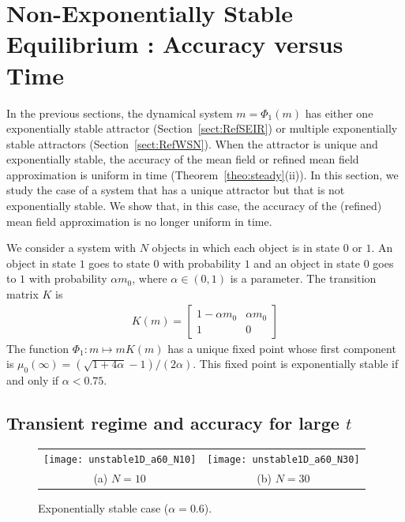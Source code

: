 \documentclass[review]{elsarticle}
\begin{document}
\section{Non-Exponentially Stable Equilibrium : Accuracy versus Time}
\label{sect:non-exponentially-stable}

In the previous sections, the dynamical system $m=\Phi_1(m)$ has
either one exponentially stable attractor (Section~\ref{sect:RefSEIR})
or multiple exponentially stable attractors
(Section~\ref{sect:RefWSN}).  When the attractor is unique and
exponentially stable, the accuracy of the mean field or refined mean
field approximation is uniform in time
(Theorem~\ref{theo:steady}(ii)).  In this section, we study the case
of a system that has a unique attractor but that is not exponentially
stable.  We show that, in this case, the accuracy of the (refined)
mean field approximation is no longer uniform in time.


We consider a system with $N$ objects in which each object is in state
$0$ or $1$. An object in state $1$ goes to state $0$ with probability
$1$ and an object in state $0$ goes to $1$ with probability
$\alpha m_0$, where $\alpha\in(0,1)$ is a parameter. The transition
matrix $K$ is
\begin{align*}
  K(m) = \left[
  \begin{array}{cc}
    1-\alpha m_0&\alpha m_0\\
    1 & 0
  \end{array}
\right]
\end{align*}
The function $\Phi_1:m\mapsto mK(m)$ has a unique fixed point whose
first component is
$\mu_0(\infty)=(\sqrt{1+4\alpha}-1)/(2\alpha)$. This fixed point is
exponentially stable if and only if $\alpha < 0.75$.

\subsection{Transient regime and accuracy for large $t$}

\begin{figure}[ht]
  \centering
  \begin{tabular}{@{}c@{}c@{}}
    \texttt{[image: unstable1D\_a60\_N10]}
    &\texttt{[image: unstable1D\_a60\_N30]}\\
    (a) $N=10$ & (b) $N=30$
  \end{tabular}
  \caption{Exponentially stable case ($\alpha=0.6$).}
  \label{fig:stable}
\end{figure}
\end{document}
